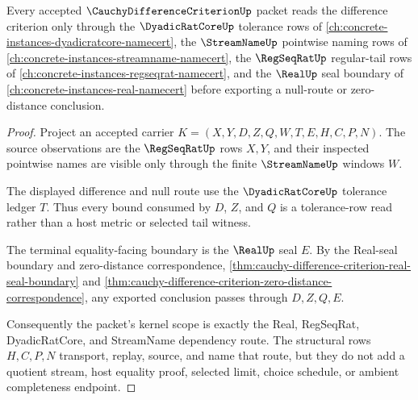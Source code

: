 \begin{theorem}
\label{thm:cauchy-difference-criterion-kernel-scope}
Every accepted $\CauchyDifferenceCriterionUp$ packet reads the difference criterion only through the $\DyadicRatCoreUp$ tolerance rows of \autoref{ch:concrete-instances-dyadicratcore-namecert}, the $\StreamNameUp$ pointwise naming rows of \autoref{ch:concrete-instances-streamname-namecert}, the $\RegSeqRatUp$ regular-tail rows of \autoref{ch:concrete-instances-regseqrat-namecert}, and the $\RealUp$ seal boundary of \autoref{ch:concrete-instances-real-namecert} before exporting a null-route or zero-distance conclusion.
\end{theorem}
\begin{proof}
Project an accepted carrier $K=(X,Y,D,Z,Q,W,T,E,H,C,P,N)$. The source observations are the $\RegSeqRatUp$ rows $X,Y$, and their inspected pointwise names are visible only through the finite $\StreamNameUp$ windows $W$.

The displayed difference and null route use the $\DyadicRatCoreUp$ tolerance ledger $T$. Thus every bound consumed by $D$, $Z$, and $Q$ is a tolerance-row read rather than a host metric or selected tail witness.

The terminal equality-facing boundary is the $\RealUp$ seal $E$. By the Real-seal boundary and zero-distance correspondence, \autoref{thm:cauchy-difference-criterion-real-seal-boundary} and \autoref{thm:cauchy-difference-criterion-zero-distance-correspondence}, any exported conclusion passes through $D,Z,Q,E$.

Consequently the packet's kernel scope is exactly the Real, RegSeqRat, DyadicRatCore, and StreamName dependency route. The structural rows $H,C,P,N$ transport, replay, source, and name that route, but they do not add a quotient stream, host equality proof, selected limit, choice schedule, or ambient completeness endpoint.
\end{proof}

